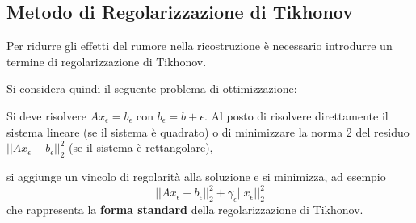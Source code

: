 {\color{ggreen}\subsection{Metodo di Regolarizzazione di Tikhonov}}
Per ridurre gli effetti del rumore nella ricostruzione è necessario introdurre un termine di regolarizzazione di Tikhonov. 

Si considera quindi il seguente problema di ottimizzazione:

Si deve risolvere $Ax_\epsilon = b_\epsilon$ con $b_\epsilon = b+\epsilon$. 
Al posto di risolvere direttamente il sistema lineare (se il sistema è quadrato) o di minimizzare la norma 2 del residuo 
$||Ax_\epsilon -b_\epsilon||_2^2$ (se il sistema è rettangolare), 

si aggiunge un vincolo di regolarità alla soluzione e si minimizza, ad esempio 
\[||Ax_\epsilon-b_\epsilon||_2^2+\gamma_\epsilon||x_\epsilon||_2^2\] che rappresenta la \textbf{forma standard} 
della regolarizzazione di Tikhonov.

